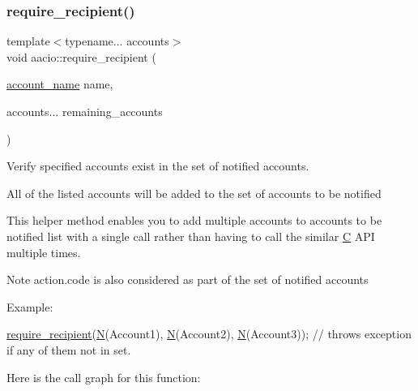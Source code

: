 \subsubsection{\texorpdfstring{require\+\_\+recipient()}{require\_recipient()}}
{\footnotesize\ttfamily template$<$typename... accounts$>$ \\
void aacio\+::require\+\_\+recipient (\begin{DoxyParamCaption}\item[{\mbox{\hyperlink{structaacio_1_1chain_1_1name}{account\+\_\+name}}}]{name,  }\item[{accounts...}]{remaining\+\_\+accounts }\end{DoxyParamCaption})}



Verify specified accounts exist in the set of notified accounts. 

All of the listed accounts will be added to the set of accounts to be notified

This helper method enables you to add multiple accounts to accounts to be notified list with a single call rather than having to call the similar \mbox{\hyperlink{struct_c}{C}} A\+PI multiple times.

\begin{DoxyNote}{Note}
action.\+code is also considered as part of the set of notified accounts
\end{DoxyNote}
Example\+: 
\begin{DoxyCode}
\mbox{\hyperlink{group__actioncapi_gae232893c733f02b94dbb70fae39d19f7}{require\_recipient}}(\mbox{\hyperlink{group__types_gaf9c1edb0e0da55ec6ba09f32f6839529}{N}}(Account1), \mbox{\hyperlink{group__types_gaf9c1edb0e0da55ec6ba09f32f6839529}{N}}(Account2), \mbox{\hyperlink{group__types_gaf9c1edb0e0da55ec6ba09f32f6839529}{N}}(Account3)); \textcolor{comment}{// throws exception if any of
       them not in set.}
\end{DoxyCode}
 Here is the call graph for this function\+:
